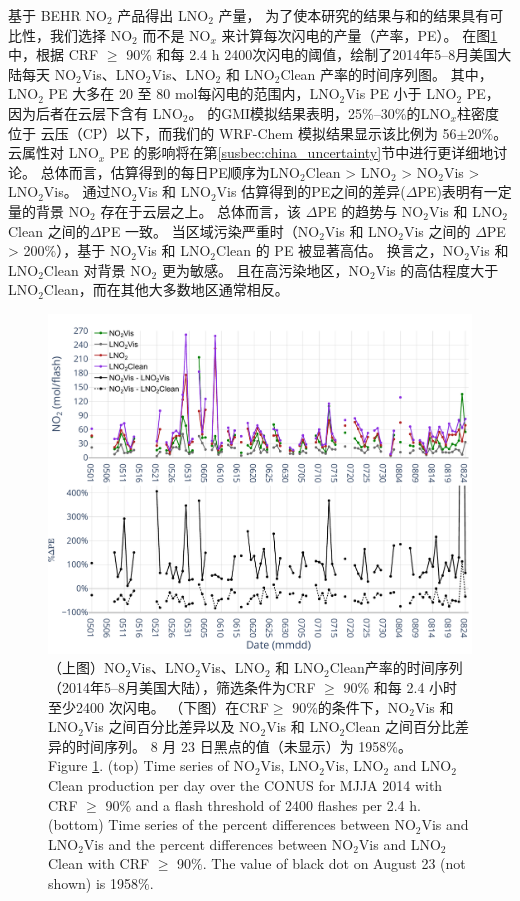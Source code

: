 \citet{Lapierre.2020}基于 BEHR NO$_2$ 产品得出 LNO$_2$ 产量，
为了使本研究的结果与\citet{Pickering.2016}和\citet{Lapierre.2020}的结果具有可比性，我们选择 NO$_2$  而不是 NO$_x$  来计算每次闪电的产量（产率，PE）。
在图\ref{fig:pe_timeseries}中，根据 CRF $\geq$ 90\% 和每 2.4 h 2400次闪电的阈值，绘制了2014年5--8月美国大陆每天 NO$_2$Vis、LNO$_2$Vis、LNO$_2$ 和 LNO$_2$Clean 产率的时间序列图。
其中，LNO$_2$ PE 大多在 20 至 80 mol每闪电的范围内，LNO$_2$Vis PE 小于 LNO$_2$ PE，因为后者在云层下含有 LNO$_2$。
\citet{Pickering.2016}的GMI模拟结果表明，25\%--30\%的LNO$_x$柱密度位于 云压（CP）以下，而我们的 WRF-Chem 模拟结果显示该比例为 56$\pm$20\%。
云属性对 LNO$_x$ PE 的影响将在第\ref{susbec:china_uncertainty}节中进行更详细地讨论。
总体而言，估算得到的每日PE顺序为LNO$_2$Clean > LNO$_2$ > NO$_2$Vis > LNO$_2$Vis。
通过NO$_2$Vis 和 LNO$_2$Vis 估算得到的PE之间的差异($\Delta$PE)表明有一定量的背景 NO$_2$ 存在于云层之上。
总体而言，该 $\Delta$PE 的趋势与 NO$_2$Vis 和 LNO$_2$Clean 之间的$\Delta$PE 一致。
当区域污染严重时（NO$_2$Vis 和 LNO$_2$Vis 之间的 $\Delta$PE > 200\%），基于 NO$_2$Vis 和 LNO$_2$Clean 的 PE 被显著高估。
换言之，NO$_2$Vis 和 LNO$_2$Clean 对背景 NO$_2$ 更为敏感。
且在高污染地区，NO$_2$Vis 的高估程度大于 LNO$_2$Clean，而在其他大多数地区通常相反。

\begin{figure}[htbp]
\centering
\includegraphics[width=12cm]{./figures/pe_timeseries.pdf}
\caption{（上图）NO$_2$Vis、LNO$_2$Vis、LNO$_2$ 和 LNO$_2$Clean产率的时间序列（2014年5--8月美国大陆），筛选条件为CRF $\geq$ 90\% 和每 2.4 小时 至少2400 次闪电。
（下图）在CRF$\geq$ 90\%的条件下，NO$_2$Vis 和 LNO$_2$Vis 之间百分比差异以及 NO$_2$Vis 和 LNO$_2$Clean 之间百分比差异的时间序列。
8 月 23 日黑点的值（未显示）为 1958\%。\\
Figure \ref{fig:pe_timeseries}. (top) Time series of NO$_2$Vis, LNO$_2$Vis, LNO$_2$ and LNO$_2$Clean production per day over the CONUS for MJJA 2014 with CRF $\geq$ 90\% and a flash threshold of 2400 flashes per 2.4 h.
(bottom) Time series of the percent differences between NO$_2$Vis and LNO$_2$Vis and the percent differences between NO$_2$Vis and LNO$_2$Clean with CRF $\geq$ 90\%.
The value of black dot on August 23 (not shown) is 1958\%.}
\label{fig:pe_timeseries}
\end{figure}

